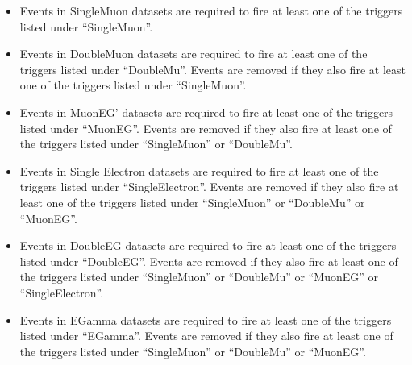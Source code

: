 \begin{itemize}
\item Events in SingleMuon datasets are required to fire at least one of the triggers listed under ``SingleMuon''. 
\item Events in DoubleMuon datasets are required to fire at least one of the triggers listed under ``DoubleMu''. Events are removed if they also fire at least one of the triggers listed under ``SingleMuon''.
\item Events in MuonEG' datasets are required to fire at least one of the triggers listed under ``MuonEG''. Events are removed if they also fire at least one of the triggers listed under ``SingleMuon'' or ``DoubleMu''.
\item Events in Single Electron datasets are required to fire at least one of the triggers listed under ``SingleElectron''. Events are removed if they also fire at least one of the triggers listed under ``SingleMuon'' or ``DoubleMu'' or ``MuonEG''.
\item Events in DoubleEG datasets are required to fire at least one of the triggers listed under ``DoubleEG''. Events are removed if they also fire at least one of the triggers listed under ``SingleMuon'' or ``DoubleMu'' or ``MuonEG'' or ``SingleElectron''.
\item Events in EGamma datasets are required to fire at least one of the triggers listed under ``EGamma''. Events are removed if they also fire at least one of the triggers listed under ``SingleMuon'' or ``DoubleMu'' or ``MuonEG''.
\end{itemize}
